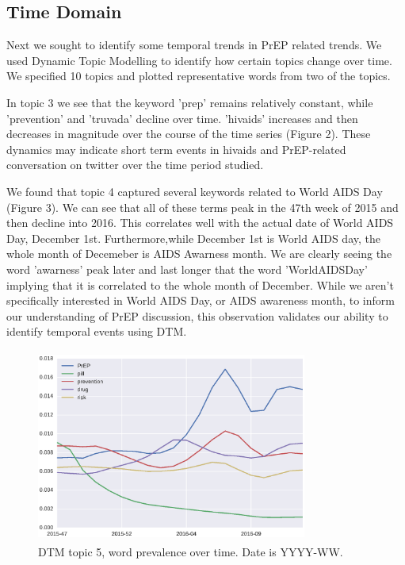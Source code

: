 \documentclass{sig-alternate-05-2015}
\begin{document}

\subsection{Time Domain}


Next we sought to identify some temporal trends in PrEP related trends. We used Dynamic Topic Modelling to identify how certain topics change over time. We specified 10 topics and plotted representative words from two of the topics.


In topic 3 we see that the keyword 'prep' remains relatively constant, while 'prevention' and 'truvada' decline over time. 'hivaids' increases and then decreases in magnitude over the course of the time series (Figure 2). These dynamics may indicate short term events in hivaids and PrEP-related conversation on twitter over the time period studied.

We found that topic 4 captured several keywords related to World AIDS Day (Figure 3). We can see that all of these terms peak in the 47th week of 2015 and then decline into 2016. This correlates well with the actual date of World AIDS Day, December 1st. Furthermore,while December 1st is World AIDS day, the whole month of Decemeber is AIDS Awarness month. We are clearly seeing the word 'awarness' peak later and last longer that the word 'WorldAIDSDay' implying that it is correlated to the whole month of December. While we aren't specifically interested in World AIDS Day, or AIDS awareness month, to inform our understanding of PrEP discussion, this observation validates our ability to identify temporal events using DTM. 




\begin{figure}
\centering
\includegraphics[height=2.5in, width=3.5in]{DTMfig1}
\caption{DTM topic 5, word prevalence over time. Date is YYYY-WW.}
\end{figure}
\end{document}
